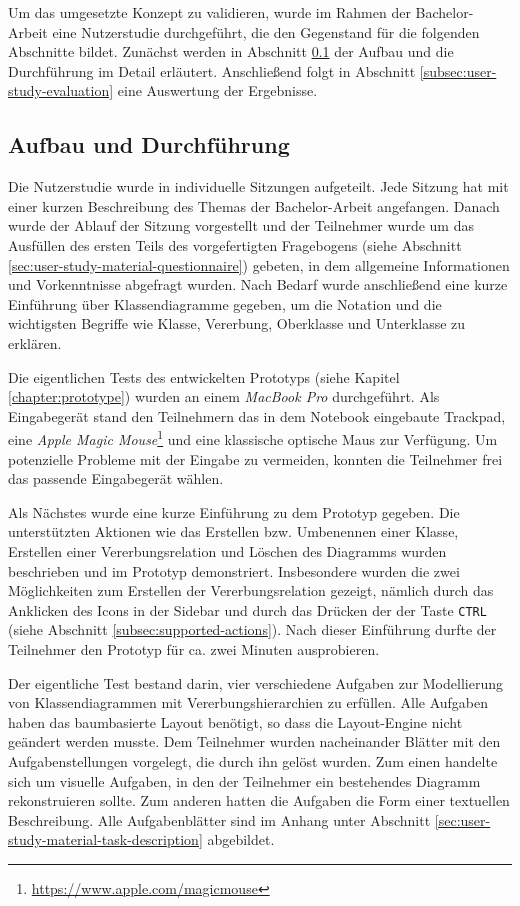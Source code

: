 Um das umgesetzte Konzept zu validieren, wurde im Rahmen der Bachelor-Arbeit eine Nutzerstudie durchgeführt, die den Gegenstand für die folgenden Abschnitte bildet. Zunächst werden in Abschnitt \ref{subsec:user-study-setup} der Aufbau und die Durchführung im Detail erläutert. Anschließend folgt in Abschnitt \ref{subsec:user-study-evaluation} eine Auswertung der Ergebnisse.

\subsection{Aufbau und Durchführung}
\label{subsec:user-study-setup}

Die Nutzerstudie wurde in individuelle Sitzungen aufgeteilt. Jede Sitzung hat mit einer kurzen Beschreibung des Themas der Bachelor-Arbeit angefangen. Danach wurde der Ablauf der Sitzung vorgestellt und der Teilnehmer wurde um das Ausfüllen des ersten Teils des vorgefertigten Fragebogens (siehe Abschnitt \ref{sec:user-study-material-questionnaire}) gebeten, in dem allgemeine Informationen und Vorkenntnisse abgefragt wurden. Nach Bedarf wurde anschließend eine kurze Einführung über Klassendiagramme gegeben, um die Notation und die wichtigsten Begriffe wie Klasse, Vererbung, Oberklasse und Unterklasse zu erklären.

Die eigentlichen Tests des entwickelten Prototyps (siehe Kapitel \ref{chapter:prototype}) wurden an einem \textit{MacBook Pro} durchgeführt. Als Eingabegerät stand den Teilnehmern das in dem Notebook eingebaute Trackpad, eine \textit{Apple Magic Mouse}\footnote{\url{https://www.apple.com/magicmouse}} und eine klassische optische Maus zur Verfügung. Um potenzielle Probleme mit der Eingabe zu vermeiden, konnten die Teilnehmer frei das passende Eingabegerät wählen.

Als Nächstes wurde eine kurze Einführung zu dem Prototyp gegeben. Die unterstützten Aktionen wie das Erstellen bzw. Umbenennen einer Klasse, Erstellen einer Vererbungsrelation und Löschen des Diagramms wurden beschrieben und im Prototyp demonstriert. Insbesondere wurden die zwei Möglichkeiten zum Erstellen der Vererbungsrelation gezeigt, nämlich durch das Anklicken des Icons in der Sidebar und durch das Drücken der der Taste \texttt{CTRL} (siehe Abschnitt \ref{subsec:supported-actions}). Nach dieser Einführung durfte der Teilnehmer den Prototyp für ca. zwei Minuten ausprobieren.

Der eigentliche Test bestand darin, vier verschiedene Aufgaben zur Modellierung von Klassendiagrammen mit Vererbungshierarchien zu erfüllen. Alle Aufgaben haben das baumbasierte Layout benötigt, so dass die Lay\-out-Engine nicht geändert werden musste. Dem Teilnehmer wurden nacheinander Blätter mit den Aufgabenstellungen vorgelegt, die durch ihn gelöst wurden. Zum einen handelte sich um visuelle Aufgaben, in den der Teilnehmer ein bestehendes Diagramm rekonstruieren sollte. Zum anderen hatten die Aufgaben die Form einer textuellen Beschreibung. Alle Aufgabenblätter sind im Anhang unter Abschnitt \ref{sec:user-study-material-task-description} abgebildet.

